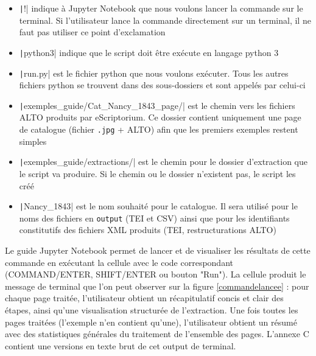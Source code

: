 \documentclass[a4paper,12pt,twoside]{book}
\begin{document}
\begin{itemize}
\item \texttt|!| indique à Jupyter Notebook que nous voulons lancer la commande sur le terminal. Si l'utilisateur lance la commande directement sur un terminal, il ne faut pas utiliser ce point d'exclamation

\item \texttt|python3| indique que le script doit être exécute en langage python 3

\item \texttt|run.py| est le fichier python que nous voulons exécuter. Tous les autres fichiers python se trouvent dans des sous-dossiers et sont appelés par celui-ci

\item \texttt|exemples_guide/Cat_Nancy_1843_page/| est le chemin vers les fichiers ALTO produits par eScriptorium. Ce dossier contient uniquement une page de catalogue (fichier \texttt{.jpg} + ALTO) afin que les premiers exemples restent simples

\item \texttt|exemples_guide/extractions/| est le chemin pour le dossier d'extraction que le script va produire. Si le chemin ou le dossier n'existent pas, le script les créé

\item \texttt|Nancy_1843| est le nom souhaité pour le catalogue. Il sera utilisé pour le noms des fichiers en \texttt{output} (TEI et CSV) ainsi que pour les identifiants constitutifs des fichiers XML produits (TEI, restructurations ALTO) 
\end{itemize}

Le guide Jupyter Notebook permet de lancer et de visualiser les résultats de cette commande en exécutant la cellule avec le code correspondant  (COMMAND/ENTER, SHIFT/ENTER ou bouton "Run"). La cellule produit le message de terminal que l'on peut observer sur la figure \ref{commandelancee} : pour chaque page traitée, l'utilisateur obtient un récapitulatif concis et clair des étapes, ainsi qu'une visualisation structurée de l'extraction. Une fois toutes les pages traitées (l'exemple n'en contient qu'une), l'utilisateur obtient un résumé avec des statistiques générales du traitement de l'ensemble des pages. L'annexe C contient une versions en texte brut de cet output de terminal. 
\end{document}
